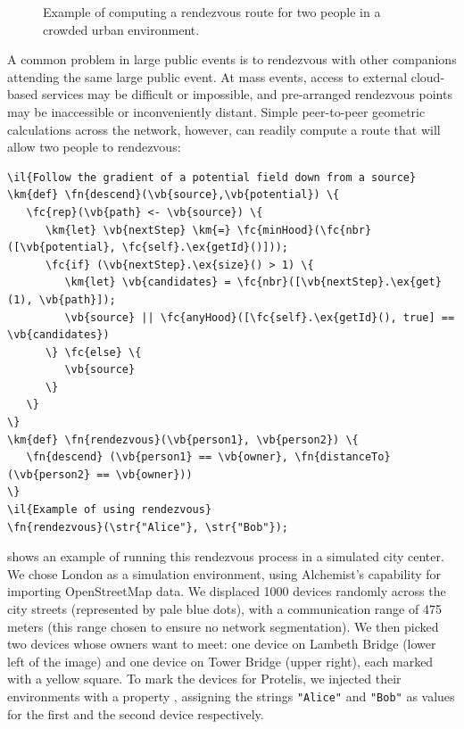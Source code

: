 \documentclass[12pt,a4paper,twoside,openright]{book}
\begin{document}
\begin{figure}
{\label{img:protelis-rendezvous-middle2}}
%
% 
\caption[Rendezvous route for two people in a crowded urban environment]{Example of computing a rendezvous route for two people in a crowded urban environment.}
\label{img:protelis-rendezvous}
\end{figure}

A common problem in large public events is to rendezvous with other companions attending the same large public event. At mass events, access to external cloud-based services may be difficult or impossible, and pre-arranged rendezvous points may be inaccessible or inconveniently distant.
%
Simple peer-to-peer geometric calculations across the network, however, can readily compute a route that will allow two people to rendezvous:
\begin{Verbatim}[samepage=true, frame=single, commandchars=\\\{\}]
\il{Follow the gradient of a potential field down from a source}
\km{def} \fn{descend}(\vb{source},\vb{potential}) \{
   \fc{rep}(\vb{path} <- \vb{source}) \{
      \km{let} \vb{nextStep} \km{=} \fc{minHood}(\fc{nbr}([\vb{potential}, \fc{self}.\ex{getId}()]));
      \fc{if} (\vb{nextStep}.\ex{size}() > 1) \{
         \km{let} \vb{candidates} = \fc{nbr}([\vb{nextStep}.\ex{get}(1), \vb{path}]);
         \vb{source} || \fc{anyHood}([\fc{self}.\ex{getId}(), true] == \vb{candidates})
      \} \fc{else} \{
         \vb{source}
      \}
   \}
\}
\km{def} \fn{rendezvous}(\vb{person1}, \vb{person2}) \{
   \fn{descend} (\vb{person1} == \vb{owner}, \fn{distanceTo}(\vb{person2} == \vb{owner}))
\}
\il{Example of using rendezvous}
\fn{rendezvous}(\str{"Alice"}, \str{"Bob"});
\end{Verbatim}

 shows an example of running this rendezvous process in a simulated city center.
%
We chose London as a simulation environment, using Alchemist's capability for importing OpenStreetMap data.
%
We displaced 1000 devices randomly across the city streets (represented by pale blue dots), with a communication range of 475 meters (this range chosen to ensure no network segmentation).
%
We then picked two devices whose owners want to meet: one device on Lambeth Bridge (lower left of the image) and one device on Tower Bridge (upper right), each marked with a yellow square.
%
To mark the devices for Protelis, we injected their environments with a property \texttt{}, assigning the strings \texttt{"Alice"} and \texttt{"Bob"} as values for the first and the second device respectively.
\end{document}
